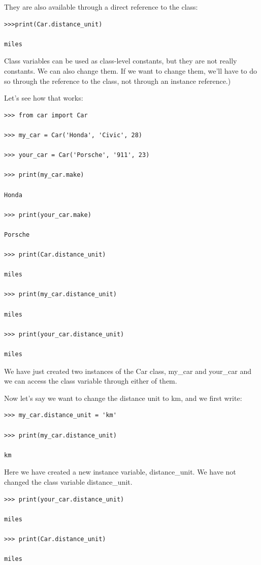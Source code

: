 \documentclass{article}
\begin{document}
They are also available through a direct reference to the class:

\begin{lstlisting}
>>>print(Car.distance_unit)

miles
\end{lstlisting}

Class variables can be used as class-level constants, but they are not really constants. We can also change them.  If we want to change them, we’ll have to do so through the reference to the class, not through an instance  reference.)

Let's see how that works:

\begin{lstlisting}
>>> from car import Car

>>> my_car = Car('Honda', 'Civic', 28)

>>> your_car = Car('Porsche', '911', 23)

>>> print(my_car.make)

Honda

>>> print(your_car.make)

Porsche

>>> print(Car.distance_unit)

miles

>>> print(my_car.distance_unit)

miles

>>> print(your_car.distance_unit)

miles
\end{lstlisting}

We have just created two instances of the Car class, my{\_}car and your{\_}car and we can access the class variable through either of them.

Now let's say we want to change the distance unit to km, and we first write:

\begin{lstlisting}
>>> my_car.distance_unit = 'km'

>>> print(my_car.distance_unit) 

km
\end{lstlisting}

Here we have created a new instance variable, distance{\_}unit.  We have not changed the class variable distance{\_}unit.

\begin{lstlisting}
>>> print(your_car.distance_unit)

miles

>>> print(Car.distance_unit)

miles
\end{lstlisting}
\end{document}
